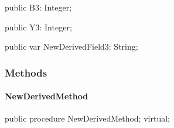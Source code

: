 \documentclass{report}
\newif\ifpdf
\begin{document}
\begin{list}{}
\begin{flushleft}
\ifpdf
\end{flushleft}
\fi


\par  \label{ok_inherited_members.TNewDerived-B3}
\item[\textbf{B3}\hfill]
\ifpdf
\begin{flushleft}
\fi
\begin{ttfamily}
public B3: Integer;\end{ttfamily}

\ifpdf
\end{flushleft}
\fi


\par  \label{ok_inherited_members.TNewDerived-Y3}
\item[\textbf{Y3}\hfill]
\ifpdf
\begin{flushleft}
\fi
\begin{ttfamily}
public Y3: Integer;\end{ttfamily}

\ifpdf
\end{flushleft}
\fi


\par  \label{ok_inherited_members.TNewDerived-NewDerivedField3}
\item[\textbf{NewDerivedField3}\hfill]
\ifpdf
\begin{flushleft}
\fi
\begin{ttfamily}
public var NewDerivedField3: String;\end{ttfamily}

\ifpdf
\end{flushleft}
\fi


\par  \end{list}
\subsubsection*{\large{\textbf{Methods}}\normalsize\hspace{1ex}\hfill}
\paragraph*{NewDerivedMethod}\hspace*{\fill}

\label{ok_inherited_members.TNewDerived-NewDerivedMethod}
\begin{list}{}{
\setlength{\itemindent}{0cm}
\setlength{\listparindent}{0cm}
\setlength{\leftmargin}{\evensidemargin}
\addtolength{\leftmargin}{\tmplength}
\settowidth{\labelsep}{X}
\addtolength{\leftmargin}{\labelsep}
\setlength{\labelwidth}{\tmplength}
}
\item[\textbf{Declaration}\hfill]
\ifpdf
\begin{flushleft}
\fi
\begin{ttfamily}
public procedure NewDerivedMethod; virtual;\end{ttfamily}

\ifpdf
\end{flushleft}
\fi

\end{list}
\end{document}
